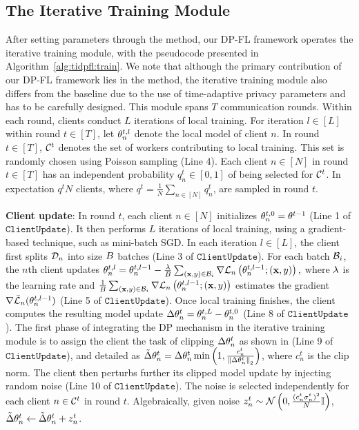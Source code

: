  \vspace{-2ex}


\subsection{The Iterative Training Module}\label{sec:proposed:alg:iterative}
After setting parameters through the \algasgo method, our DP-FL framework operates the iterative training module, with the pseudocode presented in Algorithm~\ref{alg:tidpfl:train}. We note that although the primary contribution of our DP-FL framework lies in the \algasgo method, the iterative training module also differs from the baseline due to the use of time-adaptive privacy parameters and has to be carefully designed. This module spans $T$ communication rounds. Within each round, clients conduct $L$ iterations of local training. For iteration $l\in [L]$ within round $t\in [T]$, let ${\theta}_n^{t,l}$ denote the local model of client $n$. In round $t\in [T]$, ${\mathcal{C}}^t$ denotes the set of workers contributing to local training. This set is randomly chosen using Poisson sampling (Line 4). Each client $n\in [N]$ in round $t\in [T]$ has an independent probability $q_n^t \in [0,1]$ of being selected for ${\mathcal{C}}^t$. In expectation $q^tN$ clients, where $q^t=\frac{1}{N}\sum_{n\in [N]}q_n^t$, are sampled in round $t$.

\textbf{Client update}: In round $t$, each client $n\in [N]$ initializes ${\theta}_n^{t,0}={\theta}^{t-1}$ (Line 1 of $\texttt{ClientUpdate}$). It then performs $L$ iterations of local training, using a gradient-based technique, such as mini-batch SGD. In each iteration $l\in [L]$, the client first splits $\mathcal{D}_n$ into size $B$ batches (Line 3 of $\texttt{ClientUpdate}$). For each batch ${\mathcal{B}}_i$, the $n$th client updates ${\theta}_n^{t,l} = {\theta}_n^{t,l-1}-\frac{\lambda}{B}\sum_{({\mathbf{x}},y)\in {\mathcal{B}}_i} \nabla{\mathcal{L}}_n\left({\theta}_n^{t,l-1};({\mathbf{x}},y)\right), $ where $\lambda$ is the learning rate and $\frac{1}{B}\sum_{({\mathbf{x}},y)\in {\mathcal{B}}_i} \nabla{\mathcal{L}}_n\left({\theta}_n^{t,l-1};({\mathbf{x}},y)\right)$ estimates the gradient $\nabla \bar{{\mathcal{L}}}_n({\theta}_n^{t,l-1})$ (Line 5 of $\texttt{ClientUpdate}$). Once local training finishes, the client computes the resulting model update $\Delta{\theta}_n^t = {\theta}_n^{t,L} - {\theta}_n^{t,0}$ (Line 8 of $\texttt{ClientUpdate}$). The first phase of integrating the DP mechanism in the iterative training module is to assign the client the task of clipping $\Delta{\theta}_n^t$ as shown in (Line 9 of $\texttt{ClientUpdate}$), and detailed as $\tilde{\Delta}{\theta}_n^{t} = \Delta{\theta}_n^t\min\left(1,\frac{c_n^t}{\left\|\Delta{\theta}_n^{t}\right\|_2}\right)$, where $c_n^t$ is the clip norm. The client then perturbs further its clipped model update by injecting random noise (Line 10 of $\texttt{ClientUpdate}$). The noise is selected independently for each client $n\in {\mathcal{C}}^t$ in round $t$. Algebraically, given noise $z_n^t\sim {\mathcal{N}}\left(0,\frac{(c_n^t\sigma_n^t)^2}{N}{\mathbb{I}}\right)$, $\tilde{\Delta}{\theta}_n^t \gets \tilde{\Delta}{\theta}_n^t + z_n^t
$. 


